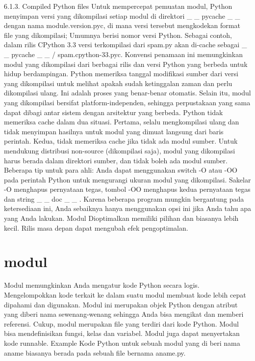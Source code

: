 6.1.3.   Compiled   Python files  
Untuk mempercepat pemuatan modul, Python menyimpan versi yang dikompilasi setiap modul di direktori    \_     \_  pycache   \_     \_   dengan nama module.version.pyc, di mana versi tersebut mengkodekan format file yang dikompilasi; Umumnya berisi nomor versi Python. Sebagai contoh, dalam rilis CPython 3.3 versi terkompilasi dari spam.py akan di-cache sebagai    \_     \_  pycache    \_     \_   / spam.cpython-33.pyc. Konvensi penamaan ini memungkinkan modul yang dikompilasi dari berbagai rilis dan versi Python yang berbeda untuk hidup berdampingan.  
Python memeriksa tanggal modifikasi sumber dari versi yang dikompilasi untuk melihat apakah sudah ketinggalan zaman dan perlu dikompilasi ulang. Ini adalah proses yang benar-benar otomatis. Selain itu, modul yang dikompilasi bersifat platform-independen, sehingga perpustakaan yang sama dapat dibagi antar sistem dengan arsitektur yang berbeda. Python tidak memeriksa cache dalam dua situasi. Pertama, selalu mengkompilasi ulang dan tidak menyimpan hasilnya untuk modul yang dimuat langsung dari baris perintah. Kedua, tidak memeriksa cache jika tidak ada modul sumber. Untuk mendukung distribusi non-source (dikompilasi saja), modul yang dikompilasi harus berada dalam direktori sumber, dan tidak boleh ada modul sumber. 
Beberapa tip untuk para ahli:  
 Anda dapat menggunakan switch -O atau -OO pada perintah Python untuk mengurangi ukuran modul yang dikompilasi. Sakelar -O menghapus pernyataan tegas, tombol -OO menghapus kedua pernyataan tegas dan string    \_     \_  doc   \_     \_  . Karena beberapa program mungkin bergantung pada ketersediaan ini, Anda sebaiknya hanya menggunakan opsi ini jika Anda tahu apa yang Anda lakukan. Modul Dioptimalkan memiliki pilihan dan biasanya lebih kecil. Rilis masa depan dapat mengubah efek pengoptimalan. 

\section{modul}

Modul memungkinkan Anda mengatur kode Python secara logis. Mengelompokkan kode terkait ke dalam suatu modul membuat kode lebih cepat dipahami dan digunakan. Modul ini merupakan objek Python dengan atribut yang diberi nama sewenang-wenang sehingga Anda bisa mengikat dan memberi referensi.
Cukup, modul merupakan file yang terdiri dari kode Python. Modul bisa mendefinisikan fungsi, kelas dan variabel. Modul juga dapat menyertakan kode runnable.
Example
Kode Python untuk sebuah modul yang di beri nama aname biasanya berada pada sebuah file bernama aname.py. 

